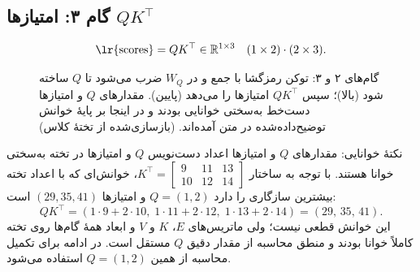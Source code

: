\subsection{گام ۳: امتیازها $Q K^{\top}$}
\[
\text{\lr{scores}} = Q K^{\top}\in\mathbb{R}^{1\times 3}\quad(1\times2)\cdot(2\times3).
\]
\begin{figure}[htbp]
\centering
{}
\caption{گام‌های ۲ و ۳:  توکن رمزگشا با  جمع و در $W_Q$ ضرب می‌شود تا $Q$ ساخته شود (بالا)؛ سپس $QK^{\top}$ امتیازها را می‌دهد (پایین). مقدارهای $Q$ و امتیازها دست‌خط به‌سختی خوانایی بودند و در اینجا بر پایهٔ خوانش توضیح‌داده‌شده در متن آمده‌اند. (بازسازی‌شده از تختهٔ کلاس)}
\end{figure}

\begin{correctionbox}{نکتهٔ خوانایی: مقدارهای $Q$ و امتیازها}
اعداد دست‌نویس $Q$ و امتیازها در تخته به‌سختی خوانا هستند. با توجه به ساختار $K^\top=\begin{bmatrix}9&11&13\\10&12&14\end{bmatrix}$، خوانش‌ای که با اعداد تخته بیشترین سازگاری را دارد $Q=(1,2)$ و امتیازها $(29,35,41)$ است:
\[
QK^\top=(1\cdot9+2\cdot10,\;1\cdot11+2\cdot12,\;1\cdot13+2\cdot14)=(29,\,35,\,41).
\]
این خوانش قطعی نیست؛ ولی ماتریس‌های $E$، $K$ و $V$ و ابعاد همهٔ گام‌ها روی تخته کاملاً خوانا بودند و منطق محاسبه از مقدار دقیق $Q$ مستقل است. در ادامه برای تکمیل محاسبه از همین $Q=(1,2)$ استفاده می‌شود.
\end{correctionbox}

